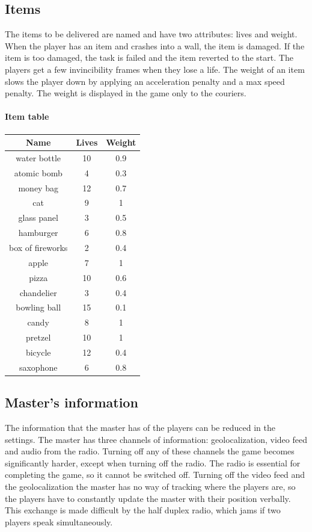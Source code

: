\documentclass[12pt]{article}
\begin{document}
\subsection{Items}
The items to be delivered are named and have two attributes: lives and weight. When the player has an item and crashes into a wall, the item is damaged. If the item is too damaged, the task is failed and the item reverted to the start. The players get a few invincibility frames when they lose a life. The weight of an item slows the player down by applying an acceleration penalty and a max speed penalty. The weight is displayed in the game only to the couriers.

\paragraph{Item table}

\begin{center}
\begin{tabular}{ |c|c|c| } 
 \hline
 Name & Lives & Weight \\ 
\hline
water bottle & 10 & 0.9\\
atomic bomb & 4 & 0.3\\
money bag & 12 & 0.7\\
cat & 9 & 1\\
glass panel & 3 & 0.5\\
hamburger & 6 & 0.8\\
box of fireworks & 2 & 0.4\\
apple & 7 & 1\\
pizza & 10 & 0.6\\
chandelier & 3 & 0.4\\
bowling ball & 15 & 0.1\\
candy & 8 & 1\\
pretzel & 10 & 1\\
bicycle & 12 & 0.4\\
saxophone & 6 & 0.8\\
 \hline
\end{tabular}
\end{center}

\subsection{Master's information}
The information that the master has of the players can be reduced in the settings. The master has three channels of information: geolocalization, video feed and audio from the radio. Turning off any of these channels the game becomes significantly harder, except when turning off the radio. The radio is essential for completing the game, so it cannot be switched off. Turning off the video feed and the geolocalization the master has no way of tracking where the players are, so the players have to constantly update the master with their position verbally. This exchange is made difficult by the half duplex radio, which jams if two players speak simultaneously.
\end{document}
